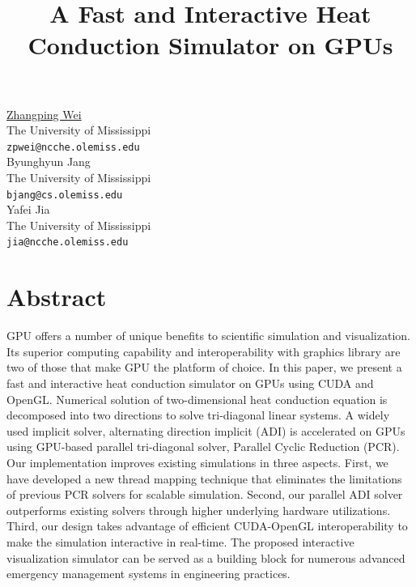 \documentclass[article,A4,11pt]{llncs}%
\begin{document}
\title{A Fast and Interactive Heat Conduction Simulator on GPUs}
 \author{} \institute{}
\maketitle
\begin{center}
{\large \underline{Zhangping Wei}}\\
The University of Mississippi\\
{\tt zpwei@ncche.olemiss.edu}
\\ \vspace{4mm}
{\large Byunghyun Jang}\\
The University of Mississippi\\
{\tt bjang@cs.olemiss.edu}
\\ \vspace{4mm}
{\large Yafei Jia}\\
The University of Mississippi\\
{\tt jia@ncche.olemiss.edu}
\end{center}

\section*{Abstract}
GPU offers a number of unique benefits to scientific simulation and visualization. Its superior computing capability and interoperability with graphics library are two of those that make GPU the platform of choice. In this paper, we present a fast and interactive heat conduction simulator on GPUs using CUDA and OpenGL. Numerical solution of two-dimensional heat conduction equation is decomposed into two directions to solve tri-diagonal linear systems. A widely used implicit solver, alternating direction implicit (ADI) is accelerated on GPUs using GPU-based parallel tri-diagonal solver, Parallel Cyclic Reduction (PCR). Our implementation improves existing simulations in three aspects. First, we have developed a new thread mapping technique that eliminates the limitations of previous PCR solvers for scalable simulation. Second, our parallel ADI solver outperforms existing solvers through higher underlying hardware utilizations. Third, our design takes advantage of efficient CUDA-OpenGL interoperability to make the simulation interactive in real-time. The proposed interactive visualization simulator can be served as a building block for numerous advanced emergency management systems in engineering practices.
\end{document}
